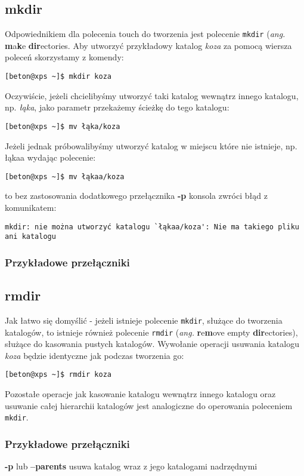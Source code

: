 \subsection{mkdir}
Odpowiednikiem dla polecenia touch do tworzenia jest polecenie \texttt{mkdir} (\textit{ang.} \textbf{m}a\textbf{k}e \textbf{dir}ectories. Aby utworzyć przykładowy katalog \textit{koza} za pomocą wiersza poleceń skorzystamy z komendy:
\begin{verbatim}
[beton@xps ~]$ mkdir koza
\end{verbatim}
Oczywiście, jeżeli chcielibyśmy utworzyć taki katalog wewnątrz innego katalogu, np. \textit{łąka}, jako parametr przekażemy ścieżkę do tego katalogu:
\begin{verbatim}
[beton@xps ~]$ mv łąka/koza
\end{verbatim}
Jeżeli jednak próbowalibyśmy utworzyć katalog w miejscu które nie istnieje, np. łąkaa wydając polecenie:
\begin{verbatim}
[beton@xps ~]$ mv łąkaa/koza
\end{verbatim}
to bez zastosowania dodatkowego przełącznika \textbf{-p} konsola zwróci błąd z komunikatem:
\begin{verbatim}
mkdir: nie można utworzyć katalogu `łąkaa/koza': Nie ma takiego pliku ani katalogu
\end{verbatim}
\subsubsection*{Przykładowe przełączniki}

\subsection{rmdir}
Jak łatwo się domyślić - jeżeli istnieje polecenie \texttt{mkdir}, służące do tworzenia katalogów, to istnieje również polecenie \texttt{rmdir} (\textit{ang.} \textbf{r}e\textbf{m}ove empty \textbf{dir}ectories), służące do kasowania pustych katalogów. Wywołanie operacji usuwania katalogu \textit{koza} będzie identyczne jak podczas tworzenia go:
\begin{verbatim}
[beton@xps ~]$ rmdir koza
\end{verbatim}
Pozostałe operacje jak kasowanie katalogu wewnątrz innego katalogu oraz usuwanie całej hierarchii katalogów jest analogiczne do operowania poleceniem \texttt{mkdir}.
\newline
\subsubsection*{Przykładowe przełączniki}
\begin{description}
\item \textbf{-p} lub \textbf{--parents} usuwa katalog wraz z jego katalogami nadrzędnymi
\end{description}

